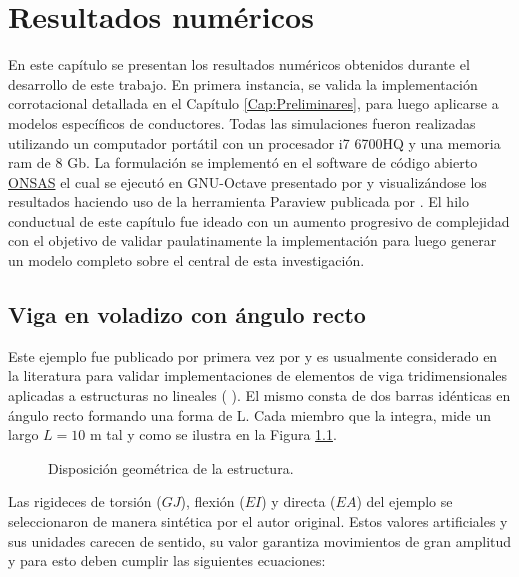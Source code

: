 \chapter{Resultados numéricos}\label{Cap:ResultadosNumericos}
\linenumbers
En este capítulo se presentan los resultados numéricos obtenidos durante el desarrollo de este trabajo. En primera instancia, se valida la implementación corrotacional detallada en el Capítulo \ref{Cap:Preliminares}, para luego aplicarse a modelos específicos de conductores. Todas las simulaciones fueron realizadas utilizando un computador portátil con un procesador i7 6700HQ y una memoria ram de 8 Gb. La formulación se implementó en el software de código abierto \href{https://github.com/ONSAS/ONSAS.m/}{ONSAS} el cual se ejecutó en GNU-Octave presentado por \cite{eaton2007gnu} y visualizándose los resultados haciendo uso de la herramienta Paraview publicada por \cite{ahrens2014image}. El hilo conductual de este capítulo fue ideado con un aumento progresivo de complejidad con el objetivo de validar paulatinamente la implementación para luego generar un modelo completo sobre el central de esta investigación.


\section{Viga en voladizo con ángulo recto}\label{Sec:RN:RightAngle}
Este ejemplo fue publicado por primera vez por \cite{simo1988dynamics} y es usualmente considerado en la literatura para validar implementaciones de elementos de viga tridimensionales aplicadas a estructuras no lineales (\citep{albino2018co} \citep{Le2014}). El mismo consta de dos barras idénticas en ángulo recto formando una forma de L. Cada miembro que la integra, mide un largo $L=10$ m tal y como se ilustra en la Figura \ref{fig:RN:RA:esquemas}.

\begingroup
\centering
\begin{figure}[htbp]
	\centering
	\label{fig:RN:RA:Ilusxy}
	\label{fig:RN:RA:Ilusyz}
	\caption{Disposición geométrica de la estructura.} 	\label{fig:RN:RA:esquemas}
\end{figure}
\endgroup

Las rigideces de torsión ($GJ$), flexión ($EI$) y directa ($EA$) del ejemplo se seleccionaron de manera sintética por el autor original. Estos valores artificiales y sus unidades carecen de sentido, su valor garantiza movimientos de gran amplitud y para esto deben cumplir las siguientes ecuaciones:

